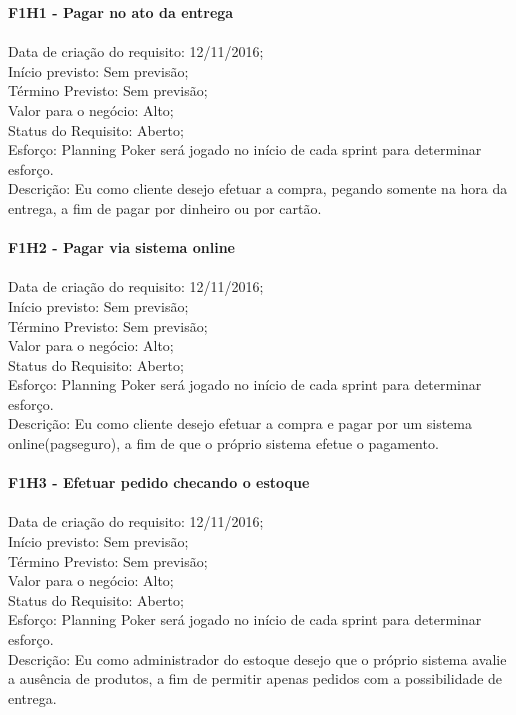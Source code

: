\begin{apendicesenv}
\textbf{F1H1 - Pagar no ato da entrega }\\ \\
\tab Data de criação do requisito: 12/11/2016;\\
\tab Início previsto: Sem previsão;\\
\tab Término Previsto: Sem previsão;\\
\tab Valor para o negócio: Alto;\\
\tab Status do Requisito: Aberto;\\
\tab Esforço: Planning Poker será jogado no início de cada sprint para determinar esforço.\\
\tab Descrição: Eu como cliente desejo efetuar a compra, pegando somente na hora da entrega, a fim de pagar por dinheiro ou por cartão.\\
\\
\textbf{F1H2 - Pagar via sistema online}\\ \\
\tab Data de criação do requisito: 12/11/2016;\\
\tab Início previsto: Sem previsão;\\
\tab Término Previsto: Sem previsão;\\
\tab Valor para o negócio: Alto;\\
\tab Status do Requisito: Aberto;\\
\tab Esforço: Planning Poker será jogado no início de cada sprint para determinar esforço.\\
\tab Descrição: Eu como cliente desejo efetuar a compra e pagar por um sistema online(pagseguro), a fim de que o próprio sistema efetue o pagamento.\\
\\
\textbf{F1H3 - Efetuar pedido checando o estoque}\\ \\
\tab Data de criação do requisito: 12/11/2016;\\
\tab Início previsto: Sem previsão;\\
\tab Término Previsto: Sem previsão;\\
\tab Valor para o negócio: Alto;\\
\tab Status do Requisito: Aberto;\\
\tab Esforço: Planning Poker será jogado no início de cada sprint para determinar esforço.\\
\tab Descrição: Eu como administrador do estoque desejo que o próprio sistema avalie a ausência de produtos, a fim de permitir apenas pedidos com a possibilidade de entrega.\\

\end{apendicesenv}
